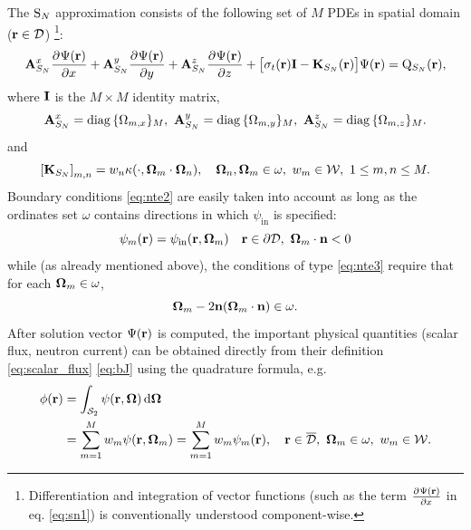 The $\text{S}_{N}$ approximation consists of the
following set of $M$ PDEs in spatial domain ($\mathbf{r}\in\mathcal{D}$) \footnote{Differentiation and integration of vector functions
(such as the term $\frac{\partial^{}\Psi(\mathbf{r})}{\partial x^{}}$ in eq. \eqref{eq:sn1}) is conventionally understood component-wise.}:
\begin{equation}\label{eq:sn1} 
\mathbf{A}_{S_N}^x\frac{\partial^{}\Psi(\mathbf{r})}{\partial x^{}} + \mathbf{A}_{S_N}^y\frac{\partial^{}\Psi(\mathbf{r})}{\partial y^{}} +
\mathbf{A}_{S_N}^z\frac{\partial^{}\Psi(\mathbf{r})}{\partial z^{}} + \bigl[\sigma_t(\mathbf{r})\mathbf{I} - \mathbf{K}_{S_N}(\mathbf{r})\bigr]\Psi(\mathbf{r}) = \mathrm{Q}_{S_N}(\mathbf{r}),
\end{equation}
where $\mathbf{I}$ is the $M\times M$ identity matrix,
$$
	\mathbf{A}_{S_N}^x = \operatorname{diag\,}\{\Omega_{m,x}\}_{M},\ \mathbf{A}_{S_N}^y = \operatorname{diag\,}\{\Omega_{m,y}\}_{M},\
	\mathbf{A}_{S_N}^z = \operatorname{diag\,}\{\Omega_{m,z}\}_{M}.
$$
and
\begin{equation}\label{eq:SNK}
	\left[\mathbf{K}_{S_N}\right]_{m,n} = w_n \kappa(\cdot,\mathbf{\Omega}_m\cdot\mathbf{\Omega}_n),\quad
	\mathbf{\Omega}_n,\mathbf{\Omega}_m\in \omega,\ w_m\in \mathcal{W},\ 1 \leq m,n \leq M.
\end{equation}
Boundary conditions \eqref{eq:nte2} are easily taken into account as long as the ordinates set $\omega$ contains
directions in which $\psi_{\text{in}}$ is specified:
\begin{equation}\label{eq:bc_sn}
	\psi_m(\br) = \psi_{\text{in}}(\br, \bomega_m)\quad \br\in\pV, \ \bomega_m\cdot\bn < 0
\end{equation}	
while (as already mentioned above), the conditions of type
\eqref{eq:nte3} require that for each $\mathbf{\Omega}_m\in\omega$, 
$$
	\mathbf{\Omega}_m - 2 \mathbf{n} (\mathbf{\Omega}_m \cdot \mathbf{n}) \in \omega.
$$ 
After solution vector $\Psi(\mathbf{r})$ is computed, the
important physical quantities (scalar flux, neutron current) can be obtained directly from their definition \eqref{eq:scalar_flux}
\eqref{eq:bJ} using the quadrature formula, e.g.
\begin{equation}\label{eq:scalar_flux_sn}
\begin{aligned}
	\phi(\mathbf{r}) &= \int_{\mathcal{S}_2}\psi(\mathbf{r},\mathbf{\Omega})\,\text{d}\mathbf{\Omega}\,\\
	 &= \sum_{m=1}^{M} w_m \psi(\mathbf{r},\mathbf{\Omega}_m) = \sum_{m=1}^{M} w_m \psi_m(\mathbf{r}), \quad
	\mathbf{r}\in \overline{\mathcal{D}},\ \mathbf{\Omega}_m\in \omega,\ w_m\in \mathcal{W}.
\end{aligned}
\end{equation}

